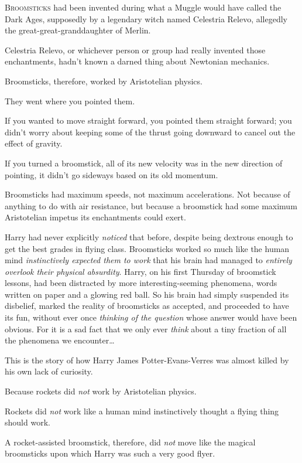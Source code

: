 
\lettrine{B}{roomsticks} had been invented during what a Muggle would have called the Dark Ages, supposedly by a legendary witch named Celestria Relevo, allegedly the great-great-granddaughter of Merlin.

Celestria Relevo, or whichever person or group had really invented those enchantments, hadn't known a darned thing about Newtonian mechanics.

Broomsticks, therefore, worked by Aristotelian physics.

They went where you pointed them.

If you wanted to move straight forward, you pointed them straight forward; you didn't worry about keeping some of the thrust going downward to cancel out the effect of gravity.

If you turned a broomstick, all of its new velocity was in the new direction of pointing, it didn't go sideways based on its old momentum.

Broomsticks had maximum speeds, not maximum accelerations. Not because of anything to do with air resistance, but because a broomstick had some maximum Aristotelian impetus its enchantments could exert.

Harry had never explicitly \emph{noticed} that before, despite being dextrous enough to get the best grades in flying class. Broomsticks worked so much like the human mind \emph{instinctively expected them to work} that his brain had managed to \emph{entirely overlook their physical absurdity}. Harry, on his first Thursday of broomstick lessons, had been distracted by more interesting-seeming phenomena, words written on paper and a glowing red ball. So his brain had simply suspended its disbelief, marked the reality of broomsticks as accepted, and proceeded to have its fun, without ever once \emph{thinking of the question} whose answer would have been obvious. For it is a sad fact that we only ever \emph{think} about a tiny fraction of all the phenomena we encounter{\ldots}

This is the story of how Harry James Potter-Evans-Verres was almost killed by his own lack of curiosity.

Because rockets did \emph{not} work by Aristotelian physics.

Rockets did \emph{not} work like a human mind instinctively thought a flying thing should work.

A rocket-assisted broomstick, therefore, did \emph{not} move like the magical broomsticks upon which Harry was such a very good flyer.

